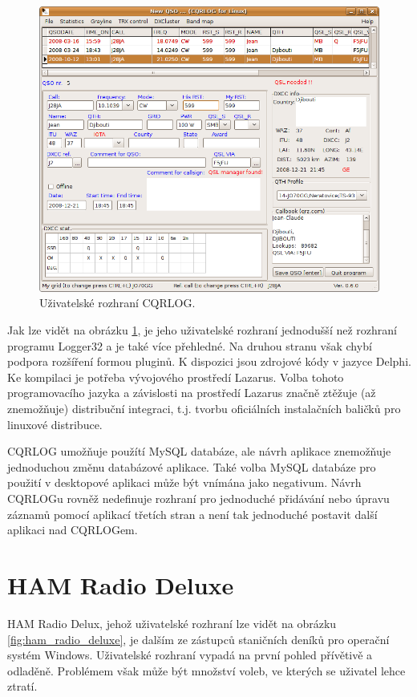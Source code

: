 \begin{figure}[h]
\centering
\includegraphics[trim=0cm 0cm 0cm 0cm, scale=0.5]{fig/cqrlog}
\caption{Uživatelské rozhraní CQRLOG.}
\label{fig:cqrlog}
\end{figure}

Jak lze vidět na obrázku \ref{fig:cqrlog}, je jeho uživatelské rozhraní jednodušší než rozhraní programu Logger32 a je
také více přehledné. Na druhou stranu však chybí podpora rozšíření formou pluginů. K dispozici jsou zdrojové kódy v jazyce
Delphi. Ke kompilaci je potřeba vývojového prostředí Lazarus. %
Volba tohoto programovacího jazyka a závislosti na prostředí Lazarus
značně ztěžuje (až znemožňuje) distribuční integraci, t.j. tvorbu oficiálních instalačních baličků pro linuxové distribuce.

CQRLOG umožňuje použítí
MySQL databáze, ale návrh aplikace znemožňuje jednoduchou změnu databázové aplikace. Také volba MySQL databáze pro použití 
v desktopové aplikaci může být vnímána jako negativum. Návrh CQRLOGu rovněž nedefinuje rozhraní pro jednoduché přidávání nebo úpravu
záznamů pomocí aplikací třetích stran a není tak jednoduché postavit další aplikaci nad CQRLOGem.

\section{HAM Radio Deluxe}

HAM Radio Delux, jehož uživatelské rozhraní lze vidět na obrázku \ref{fig:ham_radio_deluxe}, je dalším ze zástupců
staničních deníků pro operační systém Windows. Uživatelské rozhraní vypadá na první pohled přívětivě a odladěně.
Problémem však může být množství voleb, ve kterých se uživatel lehce ztratí.

